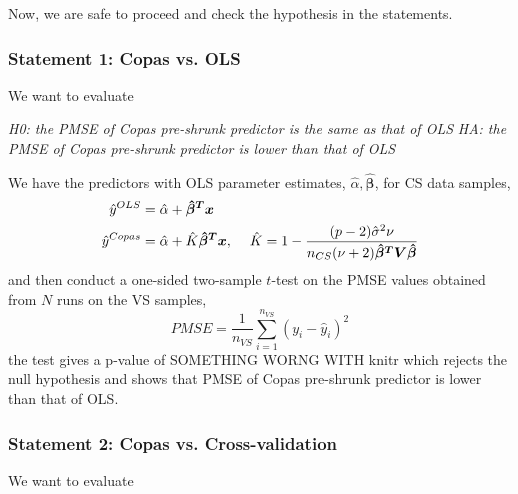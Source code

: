 \documentclass{article}
\newcommand{\rinline}[1]{SOMETHING WORNG WITH knitr}
\begin{document}
Now, we are safe to proceed and check the hypothesis in the statements.


\subsubsection*{Statement 1: Copas vs. OLS}
\hspace{12 pt}  We want to evaluate


\hspace{12 pt} \textit{H0: the PMSE of Copas pre-shrunk predictor is
  the same as that of OLS} \newline
\vspace{2 pt}
\hspace{24 pt} \textit{HA: the PMSE of Copas pre-shrunk predictor is
  lower than that of OLS} \newline


We have the predictors with OLS parameter estimates, $\hat{\alpha},
\bm{\hat{\beta}}$, for CS data samples,
\begin{displaymath}
\begin{split}
\hat{y}^{OLS} &= \hat{\alpha} + \bm{\hat{\beta}^Tx} \\
\hat{y}^{Copas} &= \hat{\alpha} + \hat{K}\bm{\hat{\beta}^Tx},
\hspace{12 pt} \hat{K} = 1 - \frac{(p-2)\hat{\sigma}^2\nu}{n_{CS}(\nu+2)\bm{\hat{\beta}^TV\hat{\beta}}}
\end{split}
\end{displaymath}
and then conduct a one-sided two-sample $t$-test on the PMSE values obtained
from $N$ runs on the VS samples,
\begin{displaymath}
PMSE = \frac{1}{n_{VS}} \sum_{i=1}^{n_{VS}} (y_i - \hat{y}_i)^2
\end{displaymath}
the test gives a p-value of 
\rinline{t.test(PMSE$copas, PMSE$ols, alter = 'less')$p.value}
which rejects the null hypothesis and shows that PMSE of Copas
pre-shrunk predictor is lower than that of OLS.





\subsubsection*{Statement 2: Copas vs. Cross-validation}
\hspace{12 pt}  We want to evaluate
\end{document}
